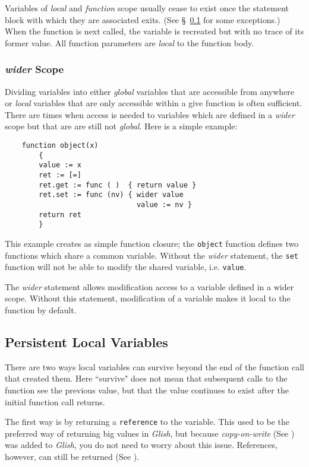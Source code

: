 Variables of {\em local} and {\em function} scope usually cease to exist
once the statement block with which they are associated exits. (See
\S~\ref{persistent-vars} for some exceptions.) When the function is next
called, the variable is recreated but with no trace of its former value.
All function parameters are {\em local} to the function body.

\subsubsection{{\em wider} Scope}
\label{wider}
Dividing variables into either {\em global} variables that  are
accessible from anywhere or {\em local} variables that are only accessible
within a give function is often sufficient.  There are times when access is
needed to variables which are defined in a {\em wider} scope but that are
are still not {\em global}. Here is a simple example:
\begin{verbatim}
    function object(x)
        {
        value := x
        ret := [=]
        ret.get := func ( )  { return value }
        ret.set := func (nv) { wider value
                               value := nv }
        return ret
        }
\end{verbatim}
\label{func-closure}
This example creates as simple function closure; the {\tt object} function
defines two functions which share a common variable. Without the {\em wider}
statement, the {\tt set} function will not be able to modify the shared
variable, i.e. {\tt value}.

The {\em wider} statement allows modification access to a variable defined
in a wider scope. Without this statement, modification of a variable makes
it local to the function by default.

\subsection{Persistent Local Variables}
\label{persistent-vars}

There are two ways  local variables can survive beyond the
end of the function call that created them.  Here ``survive" does
not mean that subsequent calls to the function see the previous
value, but that the value continues to exist after the initial
function call returns.

The first way is by returning a {\tt reference} to the variable. This
used to be the preferred way of returning big values in 
{\em Glish}, but because
{\em copy-on-write} (See ) was added to {\em Glish},
you do not need to worry about this issue.
References, however, can still be returned (See ).

